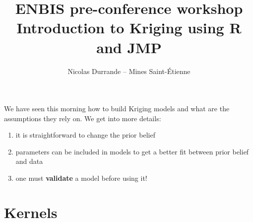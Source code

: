 \documentclass{beamer}
\title[ENBIS workshop: Introduction to Kriging 2/2]{ \small ENBIS pre-conference workshop\\ \vspace{3mm} \Large Introduction to Kriging using R and JMP }
\author[11th of Septembre 2016]{Nicolas Durrande -- Mines Saint-Étienne}
\institute{durrande@emse.fr}
\date{\null}
\DeclareMathOperator*{\Cov}{cov}
\begin{document}

\begin{frame}
  \titlepage
\end{frame}

\begin{frame}{}
We have seen this morning how to build Kriging models and what are the assumptions they rely on. We get into more details:
\begin{enumerate}
  \item it is straightforward to change the prior belief
  \item parameters can be included in models to get a better fit between prior belief and data
  \item one must \textbf{validate} a model before using it!
\end{enumerate}
\end{frame}

\section{Kernels}

\end{document}
